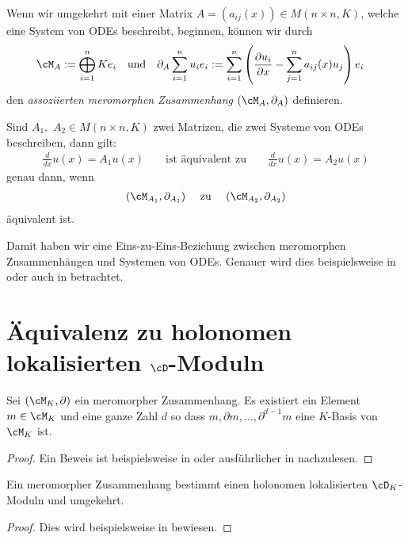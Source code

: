 \begin{defn}
Wenn wir umgekehrt mit einer Matrix $A=(a_{ij}(x))\in M(n\times n,K)$,
welche eine System von ODEs beschreibt, beginnen, können wir durch
\begin{align*}
\cM_A & :=\bigoplus_{i=1}^n Ke_i &&\text{und}
& \partial_A \sum_{i=1}^n u_ie_i &:= \sum_{i=1}^n\left(
\frac{\partial u_i}{\partial x}-\sum_{j=1}^na_{ij}(x)u_j \right)e_i
\end{align*}
den \emph{assoziierten meromorphen Zusammenhang} $(\cM_A,\partial_A)$ definieren.
\end{defn}
\begin{comment}
TODO: zueinander inverse bijektionen?
\end{comment}
\begin{lem}
Sind $A_1,$ $A_2\in M(n\times n,K)$ zwei Matrizen, die zwei Systeme von ODEs
beschreiben, dann gilt:
\begin{align*}
\frac{d}{dx}u(x)=A_1u(x) && \text{ ist äquivalent zu }
&& \frac{d}{dx}u(x)=A_2u(x)
\end{align*}
genau dann, wenn
\begin{align*}
(\cM_{A_1},\partial_{A_1}) && \text{ zu }
&& (\cM_{A_2},\partial_{A_2})
\end{align*}
äquivalent ist.
\end{lem}
Damit haben wir eine Eins-zu-Eins-Beziehung zwischen meromorphen
Zusammenhängen und Systemen von ODEs.
Genauer wird dies beispielsweise in \cite[Sec 5.1]{hotta2007d} oder
auch in \cite[Sec 3]{sabbah_cimpa90} betrachtet.

\section{Äquivalenz zu holonomen lokalisierten $\cD$-Moduln}
\begin{lem} \label{lem:Zyklischer-Vektor}
Sei $(\cM_K,\partial)$ ein meromorpher Zusammenhang. Es existiert ein Element
$m\in\cM_K$ und eine ganze Zahl $d$ so dass
$m,\partial m,\dots,\partial^{d-1}m$ eine $K$-Basis von $\cM_K$ ist.
\end{lem}

\begin{proof}
Ein Beweis ist beispielsweise in \cite[Thm 4.3.3]{sabbah_cimpa90} oder
ausführlicher in \cite[Satz 4.8]{ZulaBarbara} nachzulesen.
\end{proof}

\begin{thm}
Ein meromorpher Zusammenhang bestimmt einen holonomen lokalisierten
$\cD_K$-Moduln und umgekehrt.
\end{thm}
\begin{proof}
Dies wird beispielsweise in \cite[Thm 4.3.2]{sabbah_cimpa90} bewiesen.
\end{proof}

